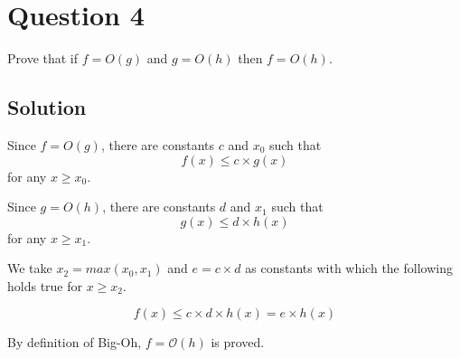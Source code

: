 
\section*{Question 4}

Prove that if $f = O(g)$ and $g = O(h)$ then $f = O(h)$.

\subsection*{Solution}
Since $f = O(g)$, there are constants $c$ and $x_0$ such that
\begin{equation}
f(x) \leq c \times g(x)
\label{eq9}
\end{equation}
for any $x \geq x_0$.

Since $g = O(h)$, there are constants $d$ and $x_1$ such that
\begin{equation}
g(x) \leq d \times h(x)
\end{equation}
for any $x \geq x_1$.

We take $x_2 = max(x_0,x_1)$ and $e = c \times d$ as constants with which the following holds true for $x \geq x_2$.

\begin{equation}
f(x) \leq c \times d \times h(x) = e \times h(x)
\end{equation}

By definition of Big-Oh, $f = \mathcal{O}(h)$ is proved.
